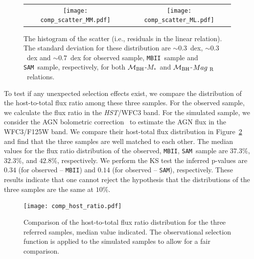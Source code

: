 \documentclass[twocolumn,trackchanges]{aastex63}
\newcommand{\hst}{{\it HST}}
\newcommand{\mbh}{$\mathcal M_{\rm BH}$}
\newcommand{\mr}{$Mag_{\rm ~R}$}
\newcommand{\mstar}{{$M_*$}}
\newcommand{\sam}{\texttt{SAM}}
\newcommand{\mbii}{\texttt{MBII}}
\begin{document}
\begin{figure}[t]%
\begin{tabular}{c c}
\texttt{[image: comp\_scatter\_MM.pdf]} &
\texttt{[image: comp\_scatter\_ML.pdf]} \\
\end{tabular}
\caption{The histogram of the scatter (i.e., residuals in the linear relation). The standard deviation for these distribution are $\sim0.3$~dex, $\sim0.3$~dex and $\sim0.7$~dex for observed sample, \mbii\ sample and \sam\ sample, respectively, for both \mbh-\mstar\ and \mbh-\mr\ relations.
}
\label{fig:offset_comp}
\end{figure}

To test if any unexpected selection effects exist, we compare the distribution of the host-to-total flux ratio among these three samples. For the observed sample, we calculate the flux ratio in the \hst/WFC3 band. For the simulated sample, we consider the AGN bolometric correction~\citep{Elvis1994} to estimate the AGN flux in the WFC3/F125W band. We compare their host-total flux distribution in Figure~\ref{fig:comp_hist} and find that the three samples are well matched to each other. The median values for the flux ratio distribution of the observed, \mbii, \sam\ sample are $37.3\%$, $32.3\%$, and $42.8\%$, respectively. We perform the KS test the inferred p-values are $0.34$ (for observed -- \mbii) and $0.14$ (for observed -- \sam), respectively. These results indicate that one cannot reject the hypothesis that the distributions of the three samples are the same at $10\%$.

\begin{figure}[t]
\texttt{[image: comp\_host\_ratio.pdf]}
\caption{Comparison of the host-to-total flux ratio distribution for the three referred samples, median value indicated. The observational selection function is applied to the simulated samples to allow for a fair comparison.
}
\label{fig:comp_hist}
\end{figure}
\end{document}
